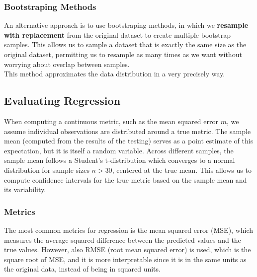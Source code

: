 \subsubsection{Bootstraping Methods}
An alternative approach is to use bootstraping methods, in which we \textbf{resample with replacement} from the original dataset to create multiple bootstrap samples.
This allows us to sample a dataset that is exactly the same size as the original dataset, permitting us to resample as many times as we want without worrying about overlap between samples.
\\
This method approximates the data distribution in a very precisely way.

\subsection{Evaluating Regression}
When computing a continuous metric, such as the mean squared error $m$, we assume individual observations are distributed around a true metric.
The sample mean (computed from the results of the testing) serves as a point estimate of this expectation, but it is itself a random variable.
Across different samples, the sample mean follows a Student's t-distribution which converges to a normal distribution for sample sizes $n > 30$, centered at the true mean.
This allows us to compute confidence intervals for the true metric based on the sample mean and its variability.

\subsubsection{Metrics}
The most common metrics for regression is the mean squared error (MSE), which measures the average squared difference between the predicted values and the true values.
However, also RMSE (root mean squared error) is used, which is the square root of MSE, and it is more interpretable since it is in the same units as the original data, instead of being in squared units.

